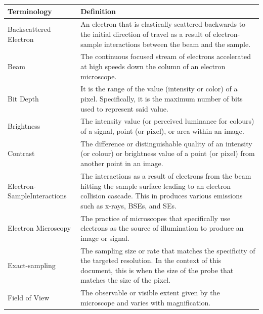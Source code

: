 \documentclass[12pt]{article}
\begin{document}
\begin{center}
    \noindent
    \begin{longtable}{p{4.25cm} p{11.25cm}} 
        \toprule
        \textbf{Terminology} & \textbf{Definition}\\
        \midrule
        Backscattered Electron & An electron that is elastically scattered backwards to the initial direction of travel as a result of electron-sample interactions between the beam and the sample. \\
        
        Beam & The continuous focused stream of electrons accelerated at high speeds down the column of an electron microscope. \\

        Bit Depth & It is the range of the value (intensity or color) of a pixel. Specifically, it is the maximum number of bits used to represent said value. \\
        
        Brightness & The intensity value (or perceived luminance for colours) of a signal, point (or pixel), or area within an image. \\
        
        Contrast & The difference or distinguishable quality of an intensity (or colour) or brightness value of a point (or pixel) from another point in an image.\\
        
        Electron-Sample\newline Interactions & The interactions as a result of electrons from the beam hitting the sample surface leading to an electron collision cascade. This in produces various emissions such as x-rays, BSEs, and SEs. \\
        
        Electron Microscopy & The practice of microscopes that specifically use electrons as the source of illumination to produce an image or signal.  \\
        
        Exact-sampling & The sampling size or rate that matches the specificity of the targeted resolution. In the context of this document, this is when the size of the probe that matches the size of the pixel. \\
        
        Field of View & The observable or visible extent given by the microscope and varies with magnification. \\
        

\end{longtable}
\end{center}
\end{document}
